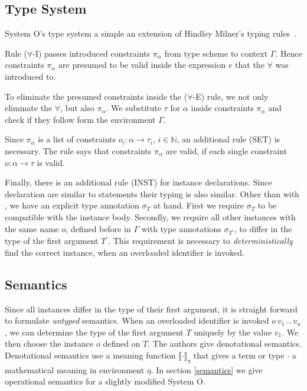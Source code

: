 \documentclass[runningheads]{llncs}
\newcommand{\snip}[1]{\footnotesize{\ttfamily{#1}}}
\begin{document}
\subsection{Type System}
System O's type system a simple an extension of Hindley Milner's typing rules~\cite{dm82}. 

Rule ($\forall$-I) passes introduced constraints $\pi_\alpha$ from type scheme to context $\Gamma$. 
Hence constraints $\pi_\alpha$ are presumed to be valid inside the expression $e$ that the $\forall$ was introduced to. 

To eliminate the presumed constraints inside the ($\forall$-E) rule, we not only eliminate the $\forall$, but also $\pi_\alpha$. We substitute $\tau$ for $\alpha$ inside constraints $\pi_\alpha$ and check if they follow form the environment $\Gamma$. 

Since $\pi_\alpha$ is a list of constraints $o_i : \alpha \rightarrow \tau_i$, $i \in \mathbb{N}$, an additional rule (SET) is necessary. 
The rule says that constraints $\pi_\alpha$ are valid, if each single constraint $o: \alpha \rightarrow \tau$ is valid.

Finally, there is an additional rule (INST) for instance declarations. 
Since \snip{inst} declaration are similar to \snip{let} statements their typing is also similar. 
Other than with \snip{let}, we have an explicit type annotation $\sigma_T$ at hand. 
First we require $\sigma_T$ to be compatible with the instance body.
Secondly, we require all other instances with the same name $o$, defined before in $\Gamma$ with type annotations $\sigma_{T^\prime}$, to differ in the type of the first argument $T^\prime$. 
This requirement is necessary to \emph{deterministically} find the correct instance, when an overloaded identifier is invoked.

\subsection{Semantics}
Since all instances differ in the type of their first argument, it is straight forward to formulate \emph{untyped} semantics.
When an overloaded identifier is invoked $o \ v_1 \ .. \ v_n$, we can determine the type of the first argument $T$ uniquely by the value $v_1$.
We then choose the instance $o$ defined on $T$. 
The authors give denotational semantics.
Denotational semantics use a meaning function $\llbracket \cdot \rrbracket_\eta$ that gives a term or type $\cdot$ a mathematical meaning in environment $\eta$.
In section \ref{semantics} we give operational semantics for a slightly modified System O. 
\end{document}
